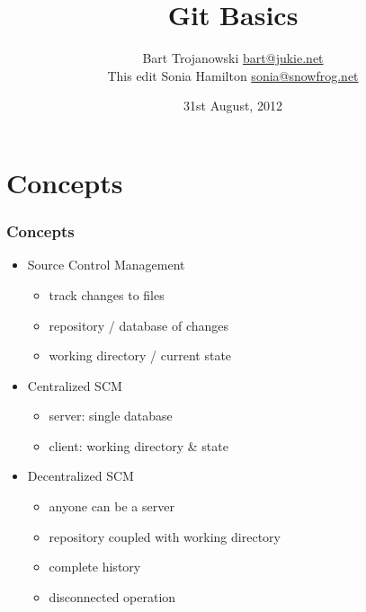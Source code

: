 \documentclass[english]{beamer}
\title{Git Basics}
\author[Bart Trojanowski, Sonia Hamilton]
{Bart Trojanowski \href{mailto:bart@jukie.net}{bart@jukie.net}\\
This edit {Sonia Hamilton \href{mailto:sonia@snowfrog.net}{sonia@snowfrog.net}}}
\institute{Jukie Networks Inc.}
\date{31st August, 2012}
\newcommand{\mysection}[2]{%
  \hypertarget{#2}{}%
  \section{#1}%
  \label{#2}%
}
\begin{document}
\label{header}\hypertarget{header}{}
\frame{\maketitle}

\begin{frame}
        \vspace{\baselineskip}
        \tableofcontents
\end{frame}

\mysection{Concepts}{_concepts}
\begin{frame}
\frametitle{Concepts}
\begin{itemize}
        \item Source Control Management
                \begin{itemize}
                        \item track changes to files
                        \item repository / database of changes
                        \item working directory / current state
                \end{itemize}

        \pause{}
        \item Centralized SCM
                \begin{itemize}
                        \item server: single database
                        \item client: working directory \&{} state
                \end{itemize}

        \pause{}
        \item Decentralized SCM
                \begin{itemize}
                        \item anyone can be a server
                        \item repository coupled with working directory
                        \item complete history
                        \item disconnected operation
                \end{itemize}
\end{itemize}

\end{frame}
\end{document}
